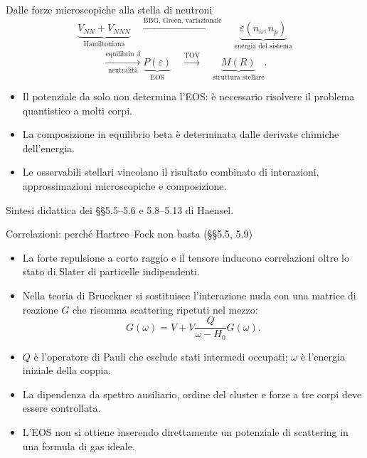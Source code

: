\begin{frame}[t]{Dalle forze microscopiche alla stella di neutroni}
\small
\[
\underbrace{V_{NN}+V_{NNN}}_{\text{Hamiltoniana}}
\quad\xrightarrow{\text{BBG, Green, variazionale}}\quad
\underbrace{\varepsilon(n_n,n_p)}_{\text{energia del sistema}}
\]
\[
\xrightarrow[\text{neutralità}]{\text{equilibrio }\beta}
\underbrace{P(\varepsilon)}_{\text{EOS}}
\quad\xrightarrow{\text{TOV}}\quad
\underbrace{M(R)}_{\text{struttura stellare}}.
\]
\begin{itemize}
\item Il potenziale da solo non determina l'EOS: è necessario risolvere il problema quantistico a molti corpi.
\item La composizione in equilibrio beta è determinata dalle derivate chimiche dell'energia.
\item Le osservabili stellari vincolano il risultato combinato di interazioni, approssimazioni microscopiche e composizione.
\end{itemize}
{\footnotesize Sintesi didattica dei §§5.5--5.6 e 5.8--5.13 di Haensel.}
\end{frame}

\begin{frame}[t]{Correlazioni: perché Hartree--Fock non basta (§§5.5, 5.9)}
\small
\begin{itemize}
\item La forte repulsione a corto raggio e il tensore inducono correlazioni oltre lo stato di Slater di particelle indipendenti.
\item Nella teoria di Brueckner si sostituisce l'interazione nuda con una matrice di reazione $G$ che risomma scattering ripetuti nel mezzo:
\[
G(\omega)=V+V\frac{Q}{\omega-H_0}G(\omega).
\]
\item $Q$ è l'operatore di Pauli che esclude stati intermedi occupati; $\omega$ è l'energia iniziale della coppia.
\item La dipendenza da spettro ausiliario, ordine del cluster e forze a tre corpi deve essere controllata.
\item L'EOS non si ottiene inserendo direttamente un potenziale di scattering in una formula di gas ideale.
\end{itemize}
\end{frame}


